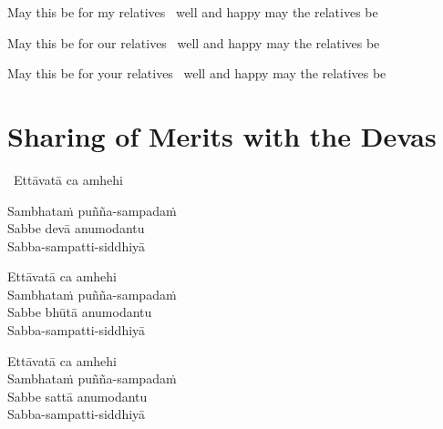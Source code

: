 \begin{english-verses}
  \begin{english-hang-first-line}
  May this be for my relatives \breathmark\ well and happy may the relatives be\\
  \end{english-hang-first-line}
  \begin{english-hang-together}
  May this be for our relatives \breathmark\ well and happy may the relatives be\\
  \end{english-hang-together}
  \begin{english-hang-together}
  May this be for your relatives \breathmark\ well and happy may the relatives be
  \end{english-hang-together}
\end{english-verses}

\suttaRef{[Pv 422]}

\ifdigital{}\fi



\section{Sharing of Merits with the Devas}
\label{sharing-merits-devas}

\begin{leader-only}
  \anglebracketleft\ \hspace{-0.5mm}Ettāvatā ca amhehi \hspace{-0.5mm}\anglebracketright\
\end{leader-only}

\vspace{-0.99em}

Sambhataṁ puñña-sampadaṁ\\
Sabbe devā anumodantu\\
Sabba-sampatti-siddhiyā

Ettāvatā ca amhehi\\
Sambhataṁ puñña-sampadaṁ\\
Sabbe bhūtā anumodantu\\
Sabba-sampatti-siddhiyā

Ettāvatā ca amhehi\\
Sambhataṁ puñña-sampadaṁ\\
Sabbe sattā anumodantu\\
Sabba-sampatti-siddhiyā

\ifdigital{}\fi

